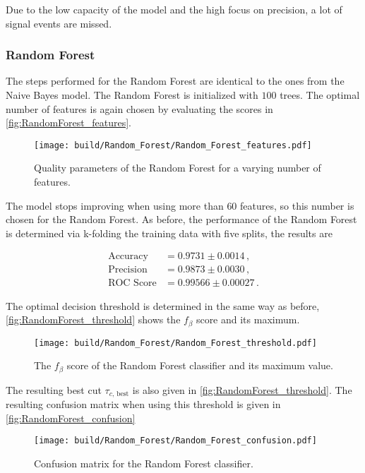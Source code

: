 Due to the low capacity of the model and the high focus on precision, a lot of signal events are missed.

\subsubsection{Random Forest}

The steps performed for the Random Forest are identical to the ones from the Naive Bayes model.
The Random Forest is initialized with $100$ trees.
The optimal number of features is again chosen by evaluating the scores in
\autoref{fig:RandomForest_features}.

\begin{figure}[H]
  \centering
  \texttt{[image: build/Random\_Forest/Random\_Forest\_features.pdf]}
  \caption{Quality parameters of the Random Forest for a varying number of features.}
  \label{fig:RandomForest_features}
\end{figure}

The model stops improving when using more than $60$ features, so this number is chosen for the Random Forest.
As before, the performance of the Random Forest is determined via k-folding the training data
with five splits, the results are

\begin{align*}
  \text{Accuracy} &= 0.9731\pm0.0014 \,, \\
  \text{Precision} &= 0.9873\pm0.0030 \,, \\
  \text{ROC Score} &= 0.99566\pm0.00027 \,.
\end{align*}

The optimal decision threshold is determined in the same way as before, \autoref{fig:RandomForest_threshold}
shows the $f_\beta$ score and its maximum.

\begin{figure}[H]
  \centering
  \texttt{[image: build/Random\_Forest/Random\_Forest\_threshold.pdf]}
  \caption{The $f_\beta$ score of the Random Forest classifier and its maximum value.}
  \label{fig:RandomForest_threshold}
\end{figure}

The resulting best cut $\tau_{c \text{, best}}$ is also given in \autoref{fig:RandomForest_threshold}. The resulting confusion matrix 
when using this threshold is given in \autoref{fig:RandomForest_confusion}

\begin{figure}[H]
  \centering
  \texttt{[image: build/Random\_Forest/Random\_Forest\_confusion.pdf]}
  \caption{Confusion matrix for the Random Forest classifier.}
  \label{fig:RandomForest_confusion}
\end{figure}

